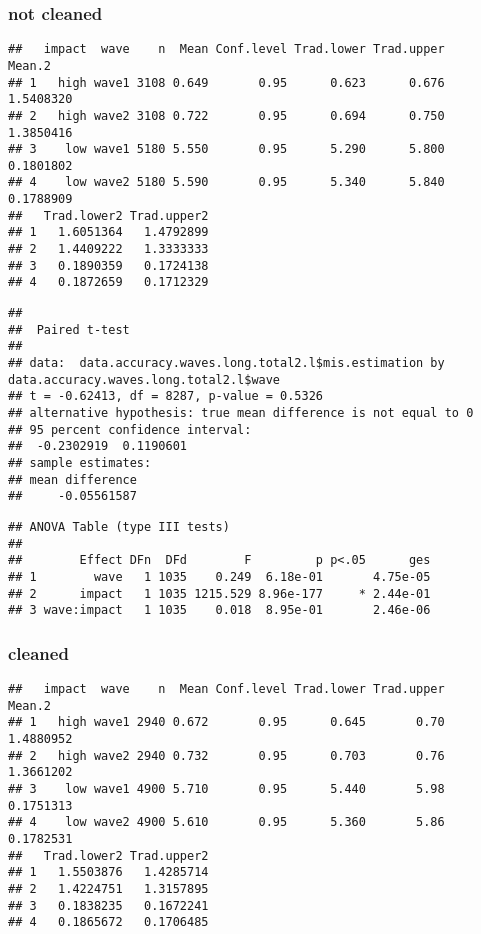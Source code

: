 \documentclass[
]{article}
\begin{document}
\hypertarget{not-cleaned}{%
\subsubsection{not cleaned}\label{not-cleaned}}

\begin{verbatim}
##   impact  wave    n  Mean Conf.level Trad.lower Trad.upper    Mean.2
## 1   high wave1 3108 0.649       0.95      0.623      0.676 1.5408320
## 2   high wave2 3108 0.722       0.95      0.694      0.750 1.3850416
## 3    low wave1 5180 5.550       0.95      5.290      5.800 0.1801802
## 4    low wave2 5180 5.590       0.95      5.340      5.840 0.1788909
##   Trad.lower2 Trad.upper2
## 1   1.6051364   1.4792899
## 2   1.4409222   1.3333333
## 3   0.1890359   0.1724138
## 4   0.1872659   0.1712329
\end{verbatim}

\begin{verbatim}
## 
##  Paired t-test
## 
## data:  data.accuracy.waves.long.total2.l$mis.estimation by data.accuracy.waves.long.total2.l$wave
## t = -0.62413, df = 8287, p-value = 0.5326
## alternative hypothesis: true mean difference is not equal to 0
## 95 percent confidence interval:
##  -0.2302919  0.1190601
## sample estimates:
## mean difference 
##     -0.05561587
\end{verbatim}

\begin{verbatim}
## ANOVA Table (type III tests)
## 
##        Effect DFn  DFd        F         p p<.05      ges
## 1        wave   1 1035    0.249  6.18e-01       4.75e-05
## 2      impact   1 1035 1215.529 8.96e-177     * 2.44e-01
## 3 wave:impact   1 1035    0.018  8.95e-01       2.46e-06
\end{verbatim}

\hypertarget{cleaned}{%
\subsubsection{cleaned}\label{cleaned}}

\begin{verbatim}
##   impact  wave    n  Mean Conf.level Trad.lower Trad.upper    Mean.2
## 1   high wave1 2940 0.672       0.95      0.645       0.70 1.4880952
## 2   high wave2 2940 0.732       0.95      0.703       0.76 1.3661202
## 3    low wave1 4900 5.710       0.95      5.440       5.98 0.1751313
## 4    low wave2 4900 5.610       0.95      5.360       5.86 0.1782531
##   Trad.lower2 Trad.upper2
## 1   1.5503876   1.4285714
## 2   1.4224751   1.3157895
## 3   0.1838235   0.1672241
## 4   0.1865672   0.1706485
\end{verbatim}
\end{document}
